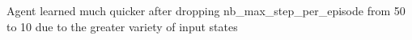 Agent learned much quicker after dropping nb\+\_\+max\+\_\+step\+\_\+per\+\_\+episode from 50 to 10 due to the greater variety of input states 